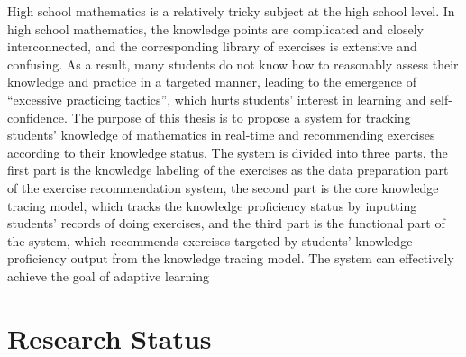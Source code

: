 
High school mathematics is a relatively tricky subject at the high school level. In high school mathematics, the knowledge points are complicated and closely interconnected, and the corresponding library of exercises is extensive and confusing. As a result, many students do not know how to reasonably assess their knowledge and practice in a targeted manner, leading to the emergence of ``excessive practicing tactics'', which hurts students' interest in learning and self-confidence. The purpose of this thesis is to propose a system for tracking students' knowledge of mathematics in real-time and recommending exercises according to their knowledge status. The system is divided into three parts, the first part is the knowledge labeling of the exercises as the data preparation part of the exercise recommendation system, the second part is the core knowledge tracing model, which tracks the knowledge proficiency status by inputting students' records of doing exercises, and the third part is the functional part of the system, which recommends exercises targeted by students' knowledge proficiency output from the knowledge tracing model. The system can effectively achieve the goal of adaptive learning

\section{Research Status}





